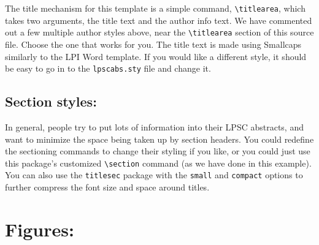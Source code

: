 \documentclass[twoside, 10pt]{article}
\begin{document}
The title mechanism for this template is a simple command,
\verb=\titlearea=, which takes two arguments, the title text and the
author info text. We have commented out a few multiple author styles above,
near the \verb=\titlearea= section of this source file. Choose the
one that works for you. The title text is made using {\sc Smallcaps} similarly to the LPI Word
template.  If you would like a different style, it should be easy to go in to 
the \texttt{lpscabs.sty} file and change it.

\subsection*{Section styles:} %

In general, people try to put lots of information into their LPSC
abstracts, and want to minimize the space being taken up by section
headers.  You could redefine the sectioning commands to change their
styling if you like, or you could just use this package's customized 
\verb=\section= command (as we have done in this example).  
You can also use the \texttt{titlesec} package with the \texttt{small} 
and \texttt{compact} options to further compress the font size and 
space around titles.

\section*{Figures:}
\end{document}
